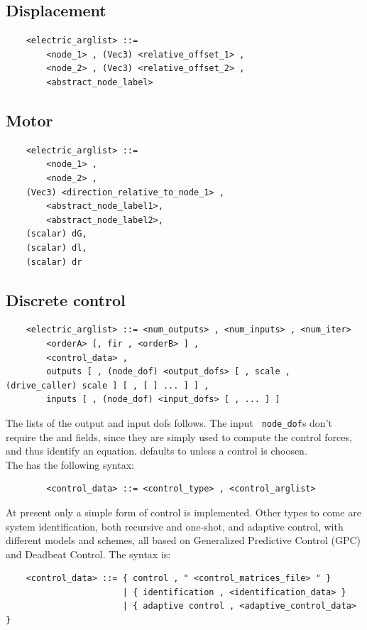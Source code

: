 \subsection{Displacement}
\begin{verbatim}
    <electric_arglist> ::=
        <node_1> , (Vec3) <relative_offset_1> ,
        <node_2> , (Vec3) <relative_offset_2> ,
        <abstract_node_label>
\end{verbatim}

\subsection{Motor}
\begin{verbatim}
    <electric_arglist> ::=
        <node_1> ,
        <node_2> , 
	(Vec3) <direction_relative_to_node_1> ,
        <abstract_node_label1>,
        <abstract_node_label2>,
	(scalar) dG,
	(scalar) dl,
	(scalar) dr
\end{verbatim}


\subsection{Discrete control}\label{sec:EL:DISCCTRL}
  \begin{verbatim}
    <electric_arglist> ::= <num_outputs> , <num_inputs> , <num_iter>
        <orderA> [, fir , <orderB> ] ,
        <control_data> , 
        outputs [ , (node_dof) <output_dofs> [ , scale , (drive_caller) scale ] [ , [ ] ... ] ] ,
        inputs [ , (node_dof) <input_dofs> [ , ... ] ]
  \end{verbatim}
  The lists of the output and input dofs follows. The input {\tt
  node\_dof}s don't require the  and  
  fields, since they are simply
  used to compute the control forces, and thus identify an equation.
   defaults to  unless a  control is choosen.\\
  The  has the following syntax:
  \begin{verbatim}  
        <control_data> ::= <control_type> , <control_arglist>
  \end{verbatim}
  At present only a simple form of control is implemented. Other types
  to come are system identification, both recursive and one-shot, and
  adaptive control, with different models and schemes, all based on 
  Generalized Predictive Control (GPC) and Deadbeat Control.
  The  syntax is:
  \begin{verbatim}
    <control_data> ::= { control , " <control_matrices_file> " }
                       | { identification , <identification_data> }
                       | { adaptive control , <adaptive_control_data> }
  \end{verbatim}
